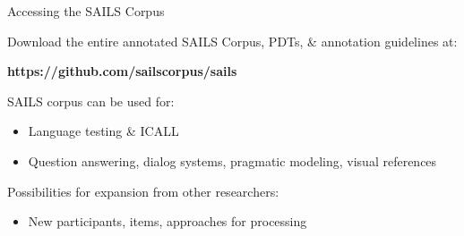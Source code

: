 \documentclass[final,14pt,t]{beamer}
\begin{document}
\begin{frame}{}
\begin{columns}[t]
\begin{column}{.33\linewidth}
\begin{minipage}[t][\textheight]{\linewidth}
\begin{block}{Accessing the SAILS Corpus}
\begin{center}
\begin{minipage}{.85\textwidth}
Download the entire annotated SAILS Corpus, PDTs, \& annotation guidelines at:
\vspace{.3em}
\begin{center}
\textbf{https://github.com/sailscorpus/sails}
\end{center}
\vspace{.6em}

SAILS corpus can be used for:
\begin{itemize}
\vspace{.3em}
\item Language testing \& ICALL
\vspace{.3em}
\item Question answering, dialog systems, pragmatic modeling, visual references
\end{itemize}

\vspace{.6em}


Possibilities for expansion from other researchers: 
\begin{itemize}
\vspace{.3em}
\item New participants, items, approaches for processing
\end{itemize}

\vspace{1.2em}
\end{minipage}
\end{center}
\end{block}
\end{minipage}
\end{column}

\end{columns}
\end{frame}
\end{document}
